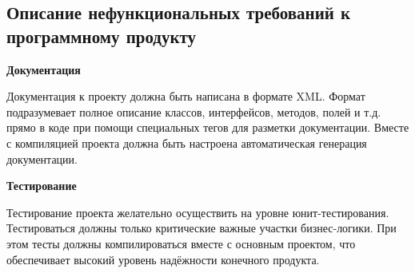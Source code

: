 \subsection{Описание нефункциональных требований к программному продукту}\label{sec:domain:nonfunc}

\textbf{Документация}

Документация к проекту должна быть написана в формате XML. Формат подразумевает полное описание классов, интерфейсов, методов, полей и т.д. прямо в коде при помощи специальных тегов для разметки документации. Вместе с компиляцией проекта должна быть настроена автоматическая генерация документации.

\bigskip
\textbf{Тестирование}

Тестирование проекта желательно осуществить на уровне юнит-тести\-рования. Тестироваться должны только критические важные участки бизнес-логики. При этом тесты должны компилироваться вместе с основным проектом, что обеспечивает высокий уровень надёжности конечного продукта.
